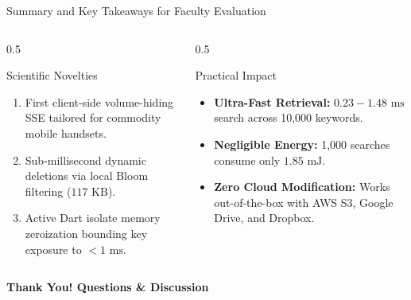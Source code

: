 \documentclass[aspectratio=169]{beamer}
\begin{document}
\begin{frame}{Summary and Key Takeaways for Faculty Evaluation}
  \begin{columns}
    \begin{column}{0.5\textwidth}
      \begin{block}{Scientific Novelties}
        \begin{enumerate}
          \item First client-side volume-hiding SSE tailored for commodity mobile handsets.
          \item Sub-millisecond dynamic deletions via local Bloom filtering ($117\text{ KB}$).
          \item Active Dart isolate memory zeroization bounding key exposure to $< 1\text{ ms}$.
        \end{enumerate}
      \end{block}
    \end{column}
    \begin{column}{0.5\textwidth}
      \begin{block}{Practical Impact}
        \begin{itemize}
          \item \textbf{Ultra-Fast Retrieval:} $0.23 - 1.48\text{ ms}$ search across 10,000 keywords.
          \item \textbf{Negligible Energy:} 1,000 searches consume only $1.85\text{ mJ}$.
          \item \textbf{Zero Cloud Modification:} Works out-of-the-box with AWS S3, Google Drive, and Dropbox.
        \end{itemize}
      \end{block}
    \end{column}
  \end{columns}
  \vspace{3mm}
  \centering
  \textbf{\large Thank You! Questions \& Discussion}
\end{frame}
\end{document}
